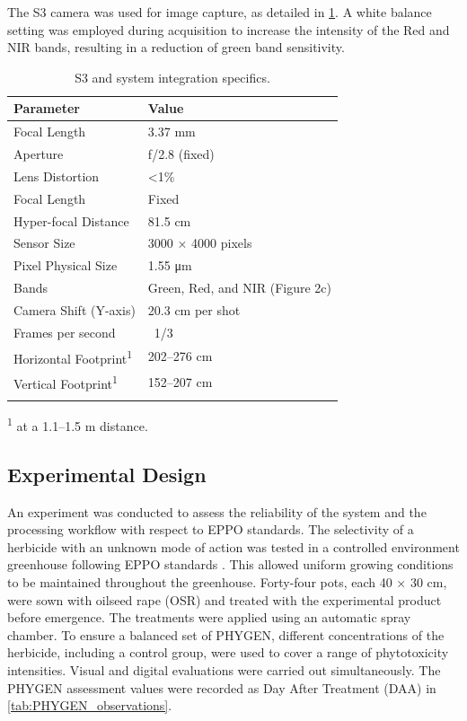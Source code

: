 \documentclass[12pt,a4paper,oneside]{report}
\begin{document}
The S3 camera was used for image capture, as detailed in \cref{tab:system_specifics}. A white balance setting was employed during acquisition to increase the intensity of the Red and NIR bands, resulting in a reduction of green band sensitivity.

\begin{table}[H]
\centering
\caption{S3 and system integration specifics.}
\begin{tabular}{p{5cm} p{5cm}}
\toprule
\textbf{Parameter} & \textbf{Value} \\
\midrule
Focal Length & 3.37 mm \\
Aperture & f/2.8 (fixed) \\
Lens Distortion & <1\% \\
Focal Length & Fixed \\
Hyper-focal Distance & 81.5 cm \\
Sensor Size & 3000 × 4000 pixels \\
Pixel Physical Size	& 1.55 μm \\
Bands & Green, Red, and NIR (Figure 2c) \\
Camera Shift (Y-axis)	& 20.3 cm per shot \\
Frames per second	& ~1/3 \\
Horizontal Footprint\textsuperscript{1}	& 202–276 cm \\
Vertical Footprint\textsuperscript{1}	& 152–207 cm \\
\bottomrule
\label{tab:system_specifics}
\end{tabular}
\begin{tablenotes}
\item[1] \footnotesize{\textsuperscript{1} at a 1.1–1.5 m distance.}
\end{tablenotes}
\end{table}

\subsection{Experimental Design}

An experiment was conducted to assess the reliability of the system and the processing workflow with respect to EPPO standards. The selectivity of a herbicide with an unknown mode of action was tested in a controlled environment greenhouse following EPPO standards 
\cite{PP11352014,DesignAnalysisEfficacy2012,PP13192021,PP11812022}. This allowed uniform growing conditions to be maintained throughout the greenhouse. Forty-four pots, each 40 × 30 cm, were sown with oilseed rape (OSR) and treated with the experimental product before emergence. The treatments were applied using an automatic spray chamber. To ensure a balanced set of PHYGEN, different concentrations of the herbicide, including a control group, were used to cover a range of phytotoxicity intensities. Visual and digital evaluations were carried out simultaneously. The PHYGEN assessment values were recorded as Day After Treatment (DAA) in
\cref{tab:PHYGEN_observations}.
\end{document}
